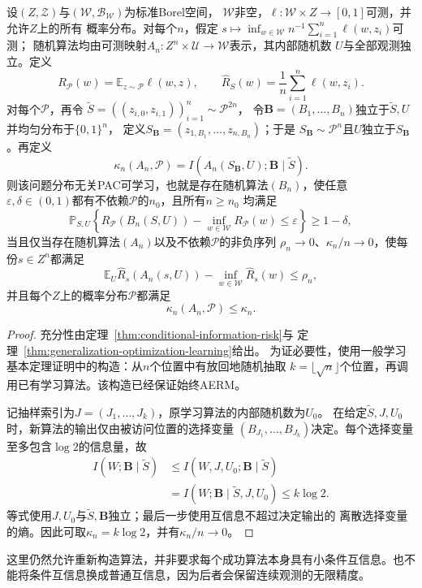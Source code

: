 \begin{theorem}[条件互信息稳定性与可学习性]
\label{thm:conditional-information-learning}
设$(Z,\mathcal Z)$与$(\mathcal W,\mathcal B_{\mathcal W})$为标准Borel空间，
$\mathcal W$非空，$\ell:\mathcal W\times Z\to[0,1]$可测，并允许$Z$上的所有
概率分布。对每个$n$，假定
$s\mapsto\inf_{w\in\mathcal W}n^{-1}\sum_{i=1}^n\ell(w,z_i)$可测；
随机算法均由可测映射$A_n:Z^n\times\mathcal U\to\mathcal W$表示，其内部随机数
$U$与全部观测独立。定义
\[
 R_{\mathcal P}(w)=\mathbb E_{z\sim\mathcal P}\ell(w,z),
 \qquad
 \hat R_S(w)=\frac1n\sum_{i=1}^n\ell(w,z_i).
\]
对每个$\mathcal P$，再令
$\tilde S=((z_{i,0},z_{i,1}))_{i=1}^n\sim\mathcal P^{2n}$，
令$\bm B=(B_1,\ldots,B_n)$独立于$\tilde S,U$并均匀分布于$\{0,1\}^n$，
定义$S_{\bm B}=(z_{1,B_1},\ldots,z_{n,B_n})$；于是
$S_{\bm B}\sim\mathcal P^n$且$U$独立于$S_{\bm B}$。再定义
\[
 \kappa_n(A_n,\mathcal P)
 =I(A_n(S_{\bm B},U);\bm B\mid\tilde S).
\]
则该问题分布无关PAC可学习，也就是存在随机算法$(B_n)$，使任意
$\varepsilon,\delta\in(0,1)$都有不依赖$\mathcal P$的$n_0$，且所有$n\geq n_0$
均满足
\[
 \mathbb P_{S,U}\!\left\{
 R_{\mathcal P}(B_n(S,U))-\inf_{w\in\mathcal W}R_{\mathcal P}(w)
 \leq\varepsilon\right\}\geq1-\delta,
\]
当且仅当存在随机算法$(A_n)$以及不依赖$\mathcal P$的非负序列
$\rho_n\to0$、$\kappa_n/n\to0$，使每份$s\in Z^n$都满足
\[
 \mathbb E_U\hat R_s(A_n(s,U))
 -\inf_{w\in\mathcal W}\hat R_s(w)\leq\rho_n,
\]
并且每个$Z$上的概率分布$\mathcal P$都满足
\[
 \kappa_n(A_n,\mathcal P)\leq\kappa_n.
\]
\end{theorem}
\begin{proof}
充分性由定理~\ref{thm:conditional-information-risk}与
定理~\ref{thm:generalization-optimization-learning}给出。
为证必要性，使用一般学习基本定理证明中的构造：从$n$个位置中有放回地随机抽取
$k=\lfloor\sqrt n\rfloor$个位置，再调用已有学习算法。该构造已经保证始终AERM。

记抽样索引为$J=(J_1,\ldots,J_k)$，原学习算法的内部随机数为$U_0$。
在给定$\tilde S,J,U_0$时，新算法的输出仅由被访问位置的选择变量
$(B_{J_1},\ldots,B_{J_k})$决定。每个选择变量至多包含$\log2$的信息量，故
\begin{align*}
 I(W;\bm B\mid\tilde S)
 &\leq I(W,J,U_0;\bm B\mid\tilde S)\\
 &=I(W;\bm B\mid\tilde S,J,U_0)
 \leq k\log2.
\end{align*}
等式使用$J,U_0$与$\tilde S,\bm B$独立；最后一步使用互信息不超过决定输出的
离散选择变量的熵。因此可取$\kappa_n=k\log2$，并有$\kappa_n/n\to0$。
\end{proof}

这里仍然允许重新构造算法，并非要求每个成功算法本身具有小条件互信息。也不能将条件互信息换成普通互信息，因为后者会保留连续观测的无限精度。

